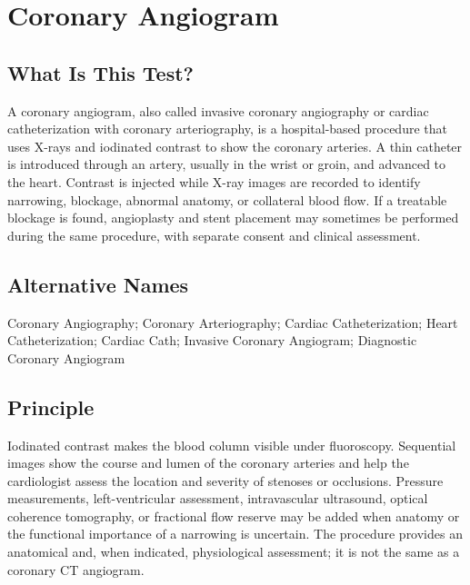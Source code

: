 \chapter{Coronary Angiogram}

\section*{What Is This Test?}
A coronary angiogram, also called invasive coronary angiography or cardiac catheterization with coronary arteriography, is a hospital-based procedure that uses X-rays and iodinated contrast to show the coronary arteries. A thin catheter is introduced through an artery, usually in the wrist or groin, and advanced to the heart. Contrast is injected while X-ray images are recorded to identify narrowing, blockage, abnormal anatomy, or collateral blood flow. If a treatable blockage is found, angioplasty and stent placement may sometimes be performed during the same procedure, with separate consent and clinical assessment.

\section*{Alternative Names}
Coronary Angiography; Coronary Arteriography; Cardiac Catheterization; Heart Catheterization; Cardiac Cath; Invasive Coronary Angiogram; Diagnostic Coronary Angiogram

\section*{Principle}
Iodinated contrast makes the blood column visible under fluoroscopy. Sequential images show the course and lumen of the coronary arteries and help the cardiologist assess the location and severity of stenoses or occlusions. Pressure measurements, left-ventricular assessment, intravascular ultrasound, optical coherence tomography, or fractional flow reserve may be added when anatomy or the functional importance of a narrowing is uncertain. The procedure provides an anatomical and, when indicated, physiological assessment; it is not the same as a coronary CT angiogram.

